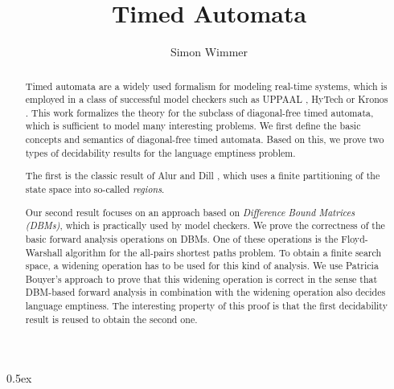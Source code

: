 \documentclass[11pt,a4paper]{article}
\begin{document}
\title{Timed Automata}
\author{Simon Wimmer}

\maketitle
\begin{abstract}
  Timed automata are a widely used formalism for modeling real-time systems, which is employed
  in a class of successful model checkers such as UPPAAL \cite{Larsen1997},
  HyTech \cite{Henzinger97hytech} or Kronos \cite{Kronos97}.
  This work formalizes the theory for the subclass of diagonal-free timed automata, which is
  sufficient to model many interesting problems.
  We first define the basic concepts and semantics of diagonal-free timed automata.
  Based on this, we prove two types of decidability results for the language emptiness problem.

  The first is the classic result of Alur and Dill \cite{alur_automata_1990,alur_theory_1994},
  which uses a finite partitioning of the state space into so-called \textit{regions}.

  Our second result focuses on an approach based on \textit{Difference Bound Matrices (DBMs)},
  which is practically used by model checkers.
  We prove the correctness of the basic forward analysis operations on DBMs.
  One of these operations is the Floyd-Warshall algorithm for the all-pairs
  shortest paths problem.
  To obtain a finite
  search space, a widening operation has to be used for this kind of analysis.
  We use Patricia Bouyer's \cite{Bou_Forward_Analysis} approach to prove that this widening operation
  is correct in the sense that DBM-based forward analysis in combination with the widening operation
  also decides language emptiness. The interesting property of this proof is that the first
  decidability result is reused to obtain the second one.
\end{abstract}

\setcounter{tocdepth}{2}
\tableofcontents
\newpage

\parindent 0pt\parskip 0.5ex





\end{document}
